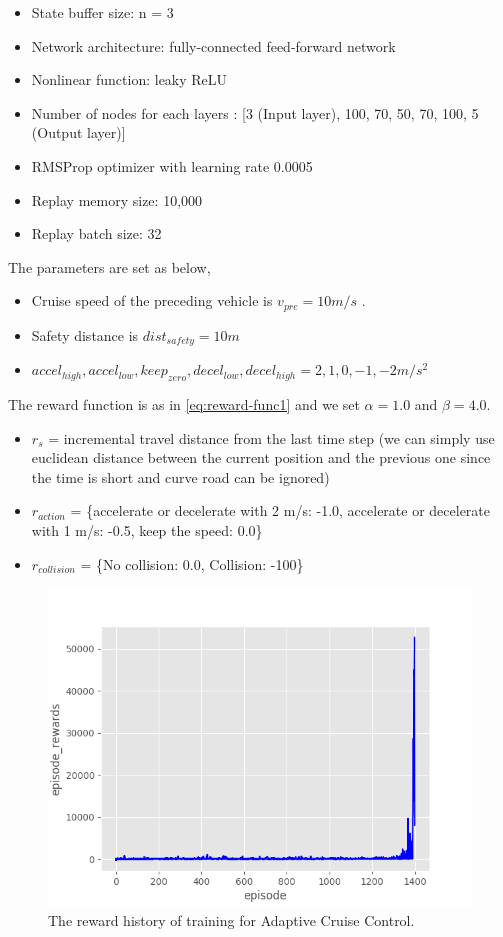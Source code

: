 \begin{itemize}
\item State buffer size: n = 3
\item Network architecture: fully-connected feed-forward network
\item Nonlinear function: leaky ReLU
\item Number of nodes for each layers : [3 (Input layer), 100, 70, 50, 70, 100, 5 (Output layer)]
\item RMSProp optimizer with learning rate 0.0005
\item Replay memory size: 10,000
\item Replay batch size: 32
\end{itemize}

The parameters are set as below,

\begin{itemize}
\item Cruise speed of the preceding vehicle is $v_{pre} = 10 m/s$ .
\item Safety distance is $dist_{safety} = 10 m$
\item $accel_{high}, accel_{low}, keep_{zero}, decel_{low}, decel_{high} = {2, 1, 0, -1, -2} m/s^2$
\end{itemize}

The reward function is as in \ref{eq:reward-func1} and we set $\alpha = 1.0$ and $\beta = 4.0$. 

\begin{itemize}
 \item $r_s$ = incremental travel distance from the last time step (we can simply use euclidean distance between the current position and the previous one since the time is short and curve road can be ignored)
 \item $r_{action}$ = \{accelerate or decelerate with 2 m/s: -1.0, accelerate or decelerate with 1 m/s: -0.5, keep the speed: 0.0\}
 \item $r_{collision}$ = \{No collision: 0.0, Collision: -100\}
\end{itemize}


\begin{figure}[h]
\centering
\includegraphics[width=1.0\textwidth]{figs/ch5/acc-reward}
\caption{The reward history of training for Adaptive Cruise Control.}
\label{fig:acc-reward}
\end{figure}

